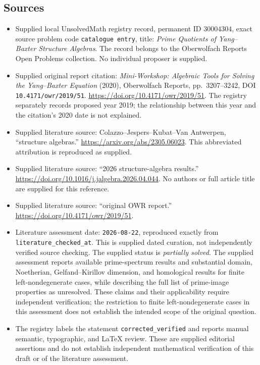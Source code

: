 \documentclass[11pt]{article}
\begin{document}
\subsection{Sources}
\begin{itemize}
\item Supplied local UnsolvedMath registry record, permanent ID \(30004304\), exact source problem code \texttt{catalogue entry}, title: \emph{Prime Quotients of Yang--Baxter Structure Algebras}. The record belongs to the Oberwolfach Reports Open Problems collection. No individual proposer is supplied.
\item Supplied original report citation: \emph{Mini-Workshop: Algebraic Tools for Solving the Yang--Baxter Equation} (2020), Oberwolfach Reports, pp.~3207--3242, DOI \texttt{10.4171/owr/2019/51}. \url{https://doi.org/10.4171/owr/2019/51}. The registry separately records proposed year 2019; the relationship between this year and the citation's 2020 date is not explained.
\item Supplied literature source: Colazzo--Jespers--Kubat--Van Antwerpen, ``structure algebras.'' \url{https://arxiv.org/abs/2305.06023}. This abbreviated attribution is reproduced as supplied.
\item Supplied literature source: ``2026 structure-algebra results.'' \url{https://doi.org/10.1016/j.jalgebra.2026.04.044}. No authors or full article title are supplied for this reference.
\item Supplied literature source: ``original OWR report.'' \url{https://doi.org/10.4171/owr/2019/51}.
\item Literature assessment date: \texttt{2026-08-22}, reproduced exactly from \texttt{literature\_checked\_at}. This is supplied dated curation, not independently verified source checking. The supplied status is \emph{partially solved}. The supplied assessment reports available prime-spectrum results and substantial domain, Noetherian, Gelfand--Kirillov dimension, and homological results for finite left-nondegenerate cases, while describing the full list of prime-image properties as unresolved. These claims and their applicability require independent verification; the restriction to finite left-nondegenerate cases in this assessment does not establish the intended scope of the original question.
\item The registry labels the statement \texttt{corrected\_verified} and reports manual semantic, typographic, and LaTeX review. These are supplied editorial assertions and do not establish independent mathematical verification of this draft or of the literature assessment.
\end{itemize}
\end{document}

